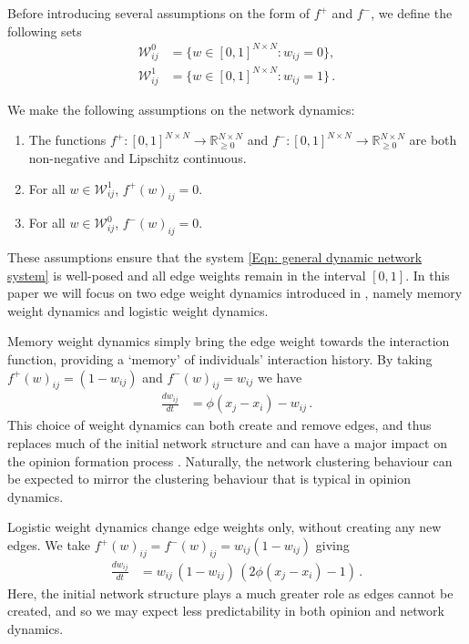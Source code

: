 \documentclass{article}
\begin{document}
Before introducing several assumptions on the form of $f^+$ and $f^-$, we define the following sets
\begin{align*}
    \mathcal{W}_{ij}^0 &= \{ w \in [0,1]^{N\times N} : w_{ij} = 0\}, \\
    \mathcal{W}_{ij}^1 &= \{ w \in [0,1]^{N\times N} : w_{ij} = 1\} \,.
\end{align*}

\begin{assumption} \label{Assumption group: weight dynamics}
    We make the following assumptions on the network dynamics:
    \begin{enumerate}[label=\alph*)]
        \item The functions $f^+:[0,1]^{N \times N} \rightarrow \mathbb{R}_{\geq0}^{N \times N}$ and $f^-:[0,1]^{N \times N} \rightarrow \mathbb{R}_{\geq0}^{N \times N}$ are both non-negative and Lipschitz continuous. 
        \item For all $w \in \mathcal{W}_{ij}^1$, $f^+(w)_{ij} = 0$. 
        \item For all $w \in \mathcal{W}_{ij}^0$, $f^-(w)_{ij} = 0$. 
    \end{enumerate}
\end{assumption}

These assumptions ensure that the system \eqref{Eqn: general dynamic network system} is well-posed and all edge weights remain in the interval $[0,1]$. In this paper we will focus on two edge weight dynamics introduced in \cite{nugent2023evolving}, namely memory weight dynamics and logistic weight dynamics. 

Memory weight dynamics simply bring the edge weight towards the interaction function, providing a `memory' of individuals' interaction history. By taking $f^+(w)_{ij} = (1-w_{ij})$ and $f^-(w)_{ij} = w_{ij}$ we have
\begin{align}
    \label{eqn: memory weight dynamics}
    \frac{dw_{ij}}{dt}
    &= \phi(x_j - x_i) - w_{ij} \,.
\end{align}
This choice of weight dynamics can both create and remove edges, and thus replaces much of the initial network structure and can have a major impact on the opinion formation process \cite{nugent2023evolving}. Naturally, the network clustering behaviour can be expected to mirror the clustering behaviour that is typical in opinion dynamics. 

Logistic weight dynamics change edge weights only, without creating any new edges. We take $f^+(w)_{ij} = f^-(w)_{ij} = w_{ij}(1 - w_{ij})$ giving
\begin{align}
    \label{eqn: logistic weight dynamics}
    \frac{dw_{ij}}{dt} 
    &= w_{ij}\,(1-w_{ij})\,(2\phi(x_j-x_i) - 1 ) \,.
\end{align}
Here, the initial network structure plays a much greater role as edges cannot be created, and so we may expect less predictability in both opinion and network dynamics. 
\end{document}
